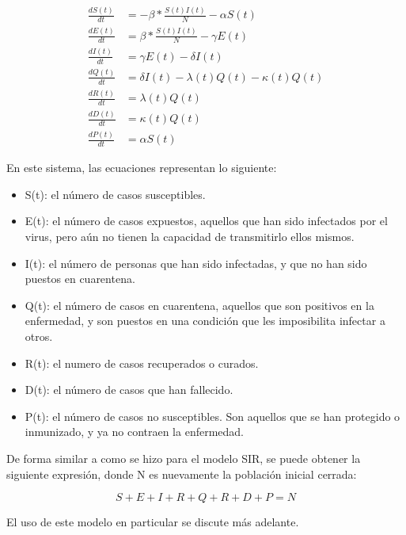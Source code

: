 \begin{equation} \label{PENG}
    \begin{split}
    \frac{dS(t)}{dt} & = - \beta * \frac{S(t) I(t)}{N} - \alpha S(t) \\
    \frac{dE(t)}{dt} & = \beta * \frac{S(t) I(t)}{N} - \gamma E(t) \\
    \frac{dI(t)}{dt} & = \gamma E(t) - \delta I(t) \\
    \frac{dQ(t)}{dt} & = \delta I(t) - \lambda(t) Q(t) - \kappa(t) Q(t) \\
    \frac{dR(t)}{dt} & = \lambda(t) Q(t) \\
    \frac{dD(t)}{dt} & = \kappa(t) Q(t) \\
    \frac{dP(t)}{dt} & = \alpha S(t)
    \end{split}
\end{equation}

En este sistema, las ecuaciones representan lo siguiente:
\begin{itemize}
    \item S(t): el número de casos susceptibles.
    \item E(t): el número de casos expuestos, aquellos que han sido infectados por el virus, pero aún no tienen la capacidad de transmitirlo ellos mismos.
    \item I(t): el número de personas que han sido infectadas, y que no han sido puestos en cuarentena.
    \item Q(t): el número de casos en cuarentena, aquellos que son positivos en la enfermedad, y son puestos en una condición que les imposibilita infectar a otros.
    \item R(t): el numero de casos recuperados o curados.
    \item D(t): el número de casos que han fallecido.
    \item P(t): el número de casos no susceptibles. Son aquellos que se han protegido o inmunizado, y ya no contraen la enfermedad.
\end{itemize}

De forma similar a como se hizo para el modelo SIR, se puede obtener la siguiente expresión, donde N es nuevamente la población inicial cerrada:

\begin{equation}
    S + E + I + R + Q + R + D + P = N
\end{equation}

El uso de este modelo en particular se discute más adelante.
